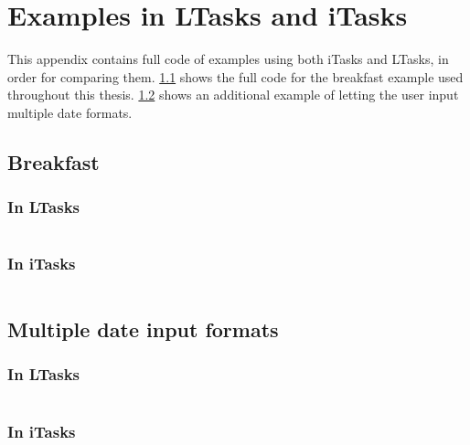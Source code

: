 \chapter{Examples in LTasks and iTasks}\label{appendix-examples}

This appendix contains full code of examples using both iTasks and LTasks, in order for comparing them. \ref{appendix-breakfast} shows the full code for the breakfast example used throughout this thesis. \ref{appendix-dates} shows an additional example of letting the user input multiple date formats.

\section{Breakfast}\label{appendix-breakfast}
\subsection{In LTasks}
\inputminted{lua}{examples/breakfast.lua}

\subsection{In iTasks}
\inputminted{clean}{examples/breakfast.icl}

\newpage
\section{Multiple date input formats}\label{appendix-dates}
\subsection{In LTasks}
\inputminted{lua}{examples/date.lua}

\subsection{In iTasks}
\inputminted{clean}{examples/date.icl}
